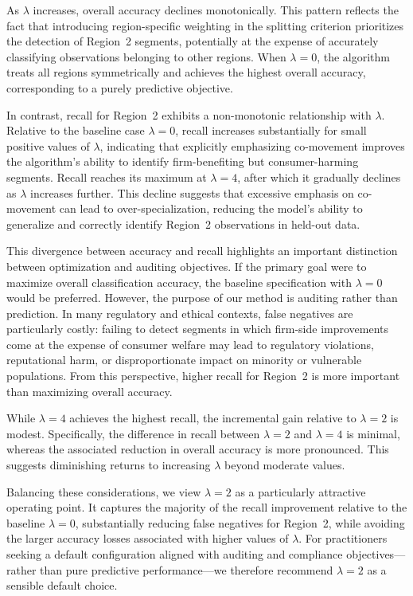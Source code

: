 \documentclass[11pt,letterpaper,english]{article}
\theoremstyle{definition}
\theoremstyle{definition}
\begin{document}
\begin{bibunit}
As $\lambda$ increases, overall accuracy declines monotonically. This pattern reflects the fact that introducing region-specific weighting in the splitting criterion prioritizes the detection of Region~2 segments, potentially at the expense of accurately classifying observations belonging to other regions. When $\lambda = 0$, the algorithm treats all regions symmetrically and achieves the highest overall accuracy, corresponding to a purely predictive objective.

In contrast, recall for Region~2 exhibits a non-monotonic relationship with $\lambda$. Relative to the baseline case $\lambda = 0$, recall increases substantially for small positive values of $\lambda$, indicating that explicitly emphasizing co-movement improves the algorithm’s ability to identify firm-benefiting but consumer-harming segments. Recall reaches its maximum at $\lambda = 4$, after which it gradually declines as $\lambda$ increases further. This decline suggests that excessive emphasis on co-movement can lead to over-specialization, reducing the model’s ability to generalize and correctly identify Region~2 observations in held-out data.

This divergence between accuracy and recall highlights an important distinction between optimization and auditing objectives. If the primary goal were to maximize overall classification accuracy, the baseline specification with $\lambda = 0$ would be preferred. However, the purpose of our method is auditing rather than prediction. In many regulatory and ethical contexts, false negatives are particularly costly: failing to detect segments in which firm-side improvements come at the expense of consumer welfare may lead to regulatory violations, reputational harm, or disproportionate impact on minority or vulnerable populations. From this perspective, higher recall for Region~2 is more important than maximizing overall accuracy.

While $\lambda = 4$ achieves the highest recall, the incremental gain relative to $\lambda = 2$ is modest. Specifically, the difference in recall between $\lambda = 2$ and $\lambda = 4$ is minimal, whereas the associated reduction in overall accuracy is more pronounced. This suggests diminishing returns to increasing $\lambda$ beyond moderate values.

Balancing these considerations, we view $\lambda = 2$ as a particularly attractive operating point. It captures the majority of the recall improvement relative to the baseline $\lambda = 0$, substantially reducing false negatives for Region~2, while avoiding the larger accuracy losses associated with higher values of $\lambda$. For practitioners seeking a default configuration aligned with auditing and compliance objectives—rather than pure predictive performance—we therefore recommend $\lambda = 2$ as a sensible default choice.


\end{bibunit}
\end{document}
